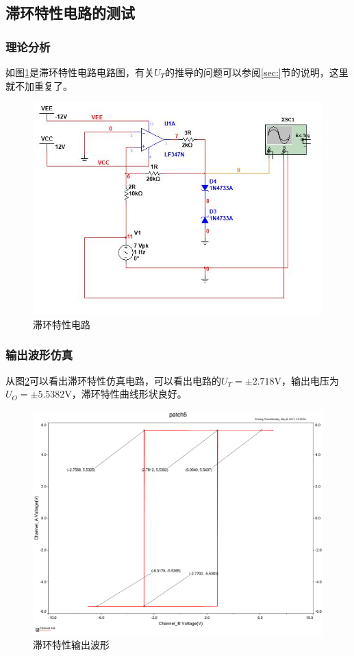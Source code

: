 \documentclass[UTF8,a4paper]{paper}
\begin{document}
\subsection{滞环特性电路的测试}
\subsubsection{理论分析}
如图\ref{schiCrit}是滞环特性电路电路图，有关$U_T$的推导的问题可以参阅\ref{sec:}节的说明，这里就不加重复了。
\begin {figure}
\includegraphics [width=\textwidth]{sch.jpg}
\caption{滞环特性电路}
\label{schiCrit}
\end {figure}
\subsubsection{输出波形仿真}
从图\ref{sch}可以看出滞环特性仿真电路，可以看出电路的$U_T=\pm 2.718\mathrm{V}$，输出电压为$U_O=\pm 5.5382\mathrm{V}$，滞环特性曲线形状良好。
\begin{figure}
\centering
\includegraphics[width=\textwidth]{sch.pdf}
\caption{滞环特性输出波形}
\label{sch}
\end{figure}
\end{document}
